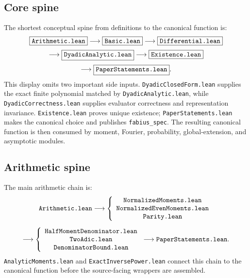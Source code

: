 \documentclass[11pt,oneside]{article}
\theoremstyle{definition}
\theoremstyle{remark}
\begin{document}
\subsection{Core spine}
The shortest conceptual spine from definitions to the canonical function is:
\[
\begin{gathered}
\boxed{\text{\texttt{Arithmetic.lean}}}
\longrightarrow
\boxed{\text{\texttt{Basic.lean}}}
\longrightarrow
\boxed{\text{\texttt{Differential.lean}}}\\[1mm]
\longrightarrow
\boxed{\text{\texttt{DyadicAnalytic.lean}}}
\longrightarrow
\boxed{\text{\texttt{Existence.lean}}}\\[1mm]
\longrightarrow
\boxed{\text{\texttt{PaperStatements.lean}}}.
\end{gathered}
\]
This display omits two important side inputs.  \nolinkurl{DyadicClosedForm.lean} supplies the exact finite polynomial matched by \nolinkurl{DyadicAnalytic.lean}, while \nolinkurl{DyadicCorrectness.lean} supplies evaluator correctness and representation invariance.  \nolinkurl{Existence.lean} proves unique existence; \nolinkurl{PaperStatements.lean} makes the canonical choice and publishes \nolinkurl{fabius_spec}.  The resulting canonical function is then consumed by moment, Fourier, probability, global-extension, and asymptotic modules.

\subsection{Arithmetic spine}
The main arithmetic chain is:
\[
\begin{gathered}
\text{\texttt{Arithmetic.lean}}
\longrightarrow
\left\{
\begin{array}{c}
\text{\texttt{NormalizedMoments.lean}}\\
\text{\texttt{NormalizedEvenMoments.lean}}\\
\text{\texttt{Parity.lean}}
\end{array}
\right.\\[2mm]
\longrightarrow
\left\{
\begin{array}{c}
\text{\texttt{HalfMomentDenominator.lean}}\\
\text{\texttt{TwoAdic.lean}}\\
\text{\texttt{DenominatorBound.lean}}
\end{array}
\right.
\longrightarrow
\text{\texttt{PaperStatements.lean}}.
\end{gathered}
\]
\nolinkurl{AnalyticMoments.lean} and \nolinkurl{ExactInversePower.lean} connect this chain to the canonical function before the source-facing wrappers are assembled.
\end{document}

